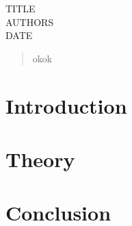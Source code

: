 \documentclass[11pt,a4paper]{article}
\begin{document}
TITLE\\
AUTHORS\\
DATE

\cleardoublepage{}
\begin{abstract}
  okok
\end{abstract}
\cleardoublepage{}
\tableofcontents{}
\section{Introduction}


\section{Theory}

\section{Conclusion}
\end{document}
